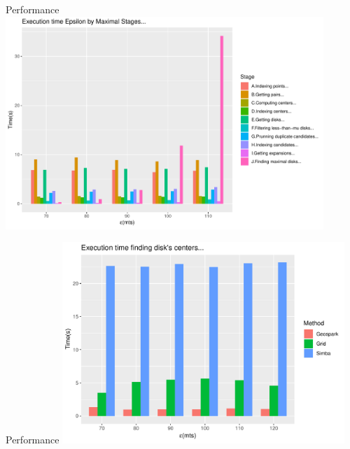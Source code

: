 \documentclass{beamer}
\theoremstyle{definition}
\begin{document}
\begin{frame}{Performance}
    \centering
    \includegraphics[width=0.9\textwidth]{MergeLastMaximalsByStage}
\end{frame}

\begin{frame}{Performance}
    \centering
    \includegraphics[width=0.8\textwidth]{indexing}
\end{frame}
\end{document}
